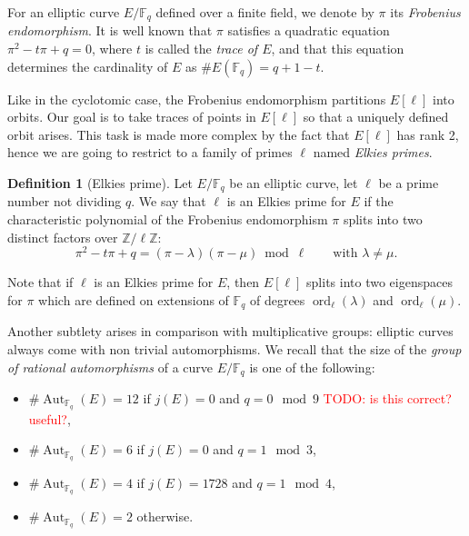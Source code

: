 \documentclass[12pt]{article}
\theoremstyle{plain}
\theoremstyle{definition}
\newtheorem{definition}[theorem]{Definition}
\newcommand{\todo}[1]{\textcolor{red}{TODO: #1}}
\DeclareMathOperator{\order}{ord} %
\DeclareMathOperator{\Aut}{Aut}
\def\Z{\ensuremath{\mathbb{Z}}}
\def\F{\ensuremath{\mathbb{F}}}
\begin{document}
For an elliptic curve $E/\F_q$ defined over a finite field, we denote
by $\pi$ its \emph{Frobenius endomorphism}. It is well known that
$\pi$ satisfies a quadratic equation $\pi^2-t\pi+q=0$, where $t$ is
called the \emph{trace of $E$}, and that this equation determines the
cardinality of $E$ as $\#E(\F_q)=q+1-t$.

Like in the cyclotomic case, the Frobenius endomorphism partitions
$E[\ell]$ into orbits. Our goal is to take traces of points in
$E[\ell]$ so that a uniquely defined orbit arises. This task is made
more complex by the fact that $E[\ell]$ has rank 2, hence we are going
to restrict to a family of primes $\ell$ named \emph{Elkies primes}.

\begin{definition}[Elkies prime]
  Let $E/\F_q$ be an elliptic curve, let $\ell$ be a prime number not
  dividing $q$.  We say that $\ell$ is an Elkies prime for $E$ if the
  characteristic polynomial of the Frobenius endomorphism $\pi$ splits
  into two distinct factors over $\Z/\ell\Z$:
\begin{equation}
\pi^2-t\pi+q=(\pi-\lambda)(\pi-\mu)\bmod\ell
\qquad\text{with $\lambda\ne\mu$}.
\end{equation}
\end{definition}

Note that if $\ell$ is an Elkies prime for $E$,
then $E[\ell]$ splits into two eigenspaces for $\pi$
which are defined on extensions of $\F_q$ of degrees
$\order_\ell(\lambda)$ and $\order_\ell(\mu)$.

Another subtlety arises in comparison with multiplicative groups:
elliptic curves always come with non trivial automorphisms. We recall
that the size of the \emph{group of rational automorphisms} of a curve
$E/\F_q$ is one of the following:
\begin{itemize}
\item $\#\Aut_{\F_q}(E) = 12$ if $j(E)=0$ and $q=0\mod 9$ \todo{is this correct? useful?},
\item $\#\Aut_{\F_q}(E) = 6$ if $j(E)=0$ and $q=1\mod 3$,
\item $\#\Aut_{\F_q}(E) = 4$ if $j(E)=1728$ and $q=1\mod 4$,
\item $\#\Aut_{\F_q}(E) = 2$ otherwise.
\end{itemize}
\end{document}
